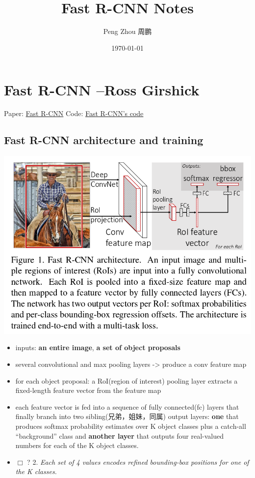 \documentclass[11pt]{book}
\title{Fast R-CNN Notes}
\author{Peng Zhou 周鹏}
\date{\today}
\begin{document}
\maketitle

\setcounter{tocdepth}{3}
\tableofcontents
\vspace*{1cm}

\part{Fast R-CNN --Ross Girshick}
\label{sec-1}

 
Paper: \href{http://arxiv.org/abs/1504.08083}{Fast R-CNN}
Code: \href{https://github.com/rbgirshick/fast-rcnn}{Fast R-CNN's code}
\chapter{Fast R-CNN architecture and training}
\label{sec-1-1}


   \includegraphics[width=.9\linewidth]{./pic_fast_rcnn/1.png}
\begin{itemize}
\item inputs: \textbf{an entire image}, \textbf{a set of object proposals}
\item several convolutional and max pooling layers -> produce a conv feature map
\item for each object proposal: a RoI(region of interest) pooling layer extracts a 
     fixed-length feature vector from the feature map
\item each feature vector is fed into a sequence of fully connected(fc) layers 
     that finally branch into two sibling(兄弟，姐妹，同属) output layers:
     \textbf{one} that produces softmax probability estimates over K object classes
     plus a catch-all ``background'' class and \textbf{another layer} that outputs 
     four real-valued numbers for each of the K object classes.
\item $\Box$ ? 2. \emph{Each set of 4 values encodes refined bounding-box positions for one of            the K classes.}
\end{itemize}
\end{document}

